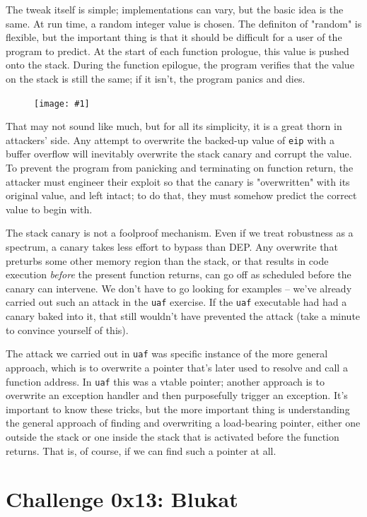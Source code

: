 \documentclass{article}
\newcommand{\wrapimageleft}[1] {
    \begin{figure}
        \begin{center}
            \texttt{[image: \#1]} 
        \end{center}
    \end{figure}
}
\newcommand{\xcode}[2]{\colorbox{ubuntuback}{\lstinline[language=#1]|#2|}}
\newcommand{\asm}[1]{\xcode{{[x86masm]assembler}}{#1}}
\newcommand{\code}[1]{\colorbox{ubuntuback}{\texttt{#1}}}
\begin{document}
The tweak itself is simple; implementations can vary, but the basic idea is the same. At run time, a random integer value is chosen. The definiton of "random" is flexible, but the important thing is that it should be difficult for a user of the program to predict. At the start of each function prologue, this value is pushed onto the stack. During the function epilogue, the program verifies that the value on the stack is still the same; if it isn't, the program panics and dies. 

\wrapimageleft{./images/stack_canary_illustration.png}

That may not sound like much, but for all its simplicity, it is a great thorn in attackers' side. 
 Any attempt to overwrite the backed-up value of \asm{eip} with a buffer overflow will inevitably overwrite the stack canary and corrupt the value. To prevent the program from panicking and terminating on function return, the attacker must engineer their exploit so that the canary is "overwritten" with its original value, and left intact; to do that, they must somehow predict the correct value to begin with.

The stack canary is not a foolproof mechanism. Even if we treat robustness as a spectrum, a canary takes less effort to bypass than DEP. Any overwrite that preturbs some other memory region than the stack, or that results in code execution \textit{before} the present function returns, can go off as scheduled before the canary can intervene. We don't have to go looking for examples -- we've already carried out such an attack in the \code{uaf} exercise. If the \code{uaf} executable had had a canary baked into it, that still wouldn't have prevented the attack (take a minute to convince yourself of this).

The attack we carried out in \code{uaf} was specific instance of the more general approach, which is to overwrite a pointer that's later used to resolve and call a function address. In \code{uaf} this was a vtable pointer; another approach is to overwrite an exception handler and then purposefully trigger an exception. It's important to know these tricks, but the more important thing is understanding the general approach of finding and overwriting a load-bearing pointer, either one outside the stack or one inside the stack that is activated before the function returns. That is, of course, if we can find such a pointer at all. 

\section{Challenge 0x13: Blukat}
\end{document}
